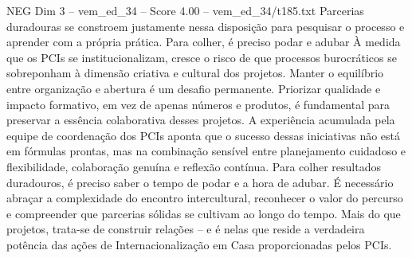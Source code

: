 \begin{textsample}{NEG Dim 3 – vem\_ed\_34 – Score 4.00 – vem\_ed\_34/t185.txt}
Parcerias duradouras se constroem justamente nessa disposição para pesquisar o processo e aprender com a própria prática.
Para colher, é preciso podar e adubar À medida que os PCIs se institucionalizam, cresce o risco de que processos burocráticos se sobreponham à dimensão criativa e cultural dos projetos.
Manter o equilíbrio entre organização e abertura é um desafio permanente.
Priorizar qualidade e impacto formativo, em vez de apenas números e produtos, é fundamental para preservar a essência colaborativa desses projetos.
A experiência acumulada pela equipe de coordenação dos PCIs aponta que o sucesso dessas iniciativas não está em fórmulas prontas, mas na combinação sensível entre planejamento cuidadoso e flexibilidade, colaboração genuína e reflexão contínua.
Para colher resultados duradouros, é preciso saber o tempo de podar e a hora de adubar.
É necessário abraçar a complexidade do encontro intercultural, reconhecer o valor do percurso e compreender que parcerias sólidas se cultivam ao longo do tempo.
Mais do que projetos, trata-se de construir relações – e é nelas que reside a verdadeira potência das ações de Internacionalização em Casa proporcionadas pelos PCIs.

\end{textsample}
